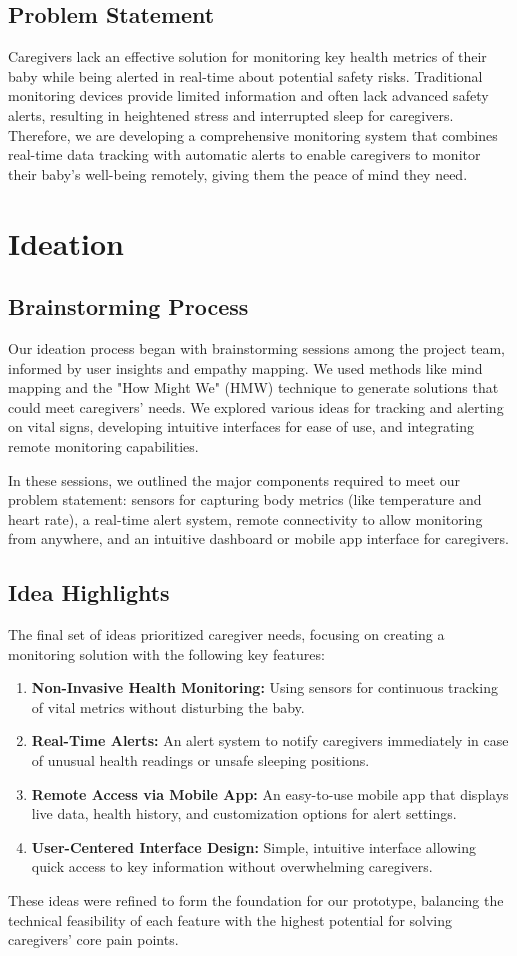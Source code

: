 \documentclass[12pt,a4paper]{report}
\begin{document}
\section{Problem Statement}
Caregivers lack an effective solution for monitoring key health metrics of their baby while being alerted in real-time about potential safety risks. Traditional monitoring devices provide limited information and often lack advanced safety alerts, resulting in heightened stress and interrupted sleep for caregivers. Therefore, we are developing a comprehensive monitoring system that combines real-time data tracking with automatic alerts to enable caregivers to monitor their baby’s well-being remotely, giving them the peace of mind they need.

\chapter{Ideation}
\section{Brainstorming Process}
Our ideation process began with brainstorming sessions among the project team, informed by user insights and empathy mapping. We used methods like mind mapping and the "How Might We" (HMW) technique to generate solutions that could meet caregivers' needs. We explored various ideas for tracking and alerting on vital signs, developing intuitive interfaces for ease of use, and integrating remote monitoring capabilities.

In these sessions, we outlined the major components required to meet our problem statement: sensors for capturing body metrics (like temperature and heart rate), a real-time alert system, remote connectivity to allow monitoring from anywhere, and an intuitive dashboard or mobile app interface for caregivers.

\section{Idea Highlights}
The final set of ideas prioritized caregiver needs, focusing on creating a monitoring solution with the following key features:
\begin{enumerate}
  \item \textbf{Non-Invasive Health Monitoring:} Using sensors for continuous tracking of vital metrics without disturbing the baby.
  \item \textbf{Real-Time Alerts:} An alert system to notify caregivers immediately in case of unusual health readings or unsafe sleeping positions.
  \item \textbf{Remote Access via Mobile App:} An easy-to-use mobile app that displays live data, health history, and customization options for alert settings.
  \item \textbf{User-Centered Interface Design:} Simple, intuitive interface allowing quick access to key information without overwhelming caregivers.
\end{enumerate}
These ideas were refined to form the foundation for our prototype, balancing the technical feasibility of each feature with the highest potential for solving caregivers’ core pain points.
\end{document}
